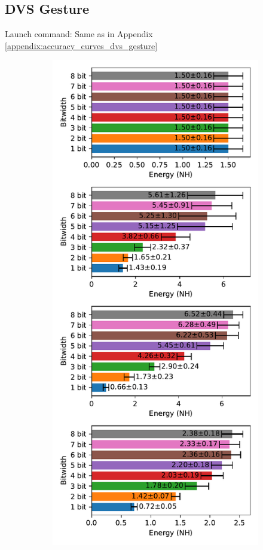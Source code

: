     \subsection{DVS Gesture}
    \label{appendix:energy_neuromorphic_dvs_gesture}
        Launch command: Same as in Appendix \ref{appendix:accuracy_curves_dvs_gesture}

        \begin{figure}[H]
            \centering
            \begin{subfigure}[H]{0.495\textwidth}
                \includegraphics[width=\textwidth]{../standard/DVSGesture/plots/dvsgesture_test_energy_nh.pdf}

\end{subfigure}
\end{figure}
